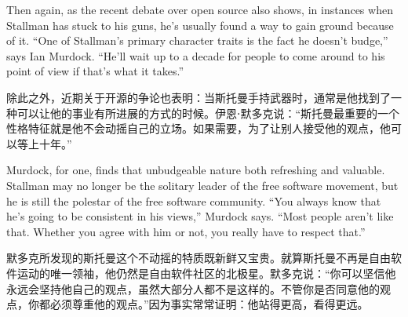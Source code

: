 

\ifdefined\eng
Then again, as the recent debate over open source also shows, in instances when Stallman has stuck to his guns, he's usually found a way to gain ground because of it. ``One of Stallman's primary character traits is the fact he doesn't budge,'' says Ian Murdock. ``He'll wait up to a decade for people to come around to his point of view if that's what it takes.''
\fi

\ifdefined\chs
除此之外，近期关于开源的争论也表明：当斯托曼手持武器时，通常是他找到了一种可以让他的事业有所进展的方式的时候。伊恩⋅默多克说：``斯托曼最重要的一个性格特征就是他不会动摇自己的立场。如果需要，为了让别人接受他的观点，他可以等上十年。''
\fi

\ifdefined\eng
Murdock, for one, finds that unbudgeable nature both refreshing and valuable. Stallman may no longer be the solitary leader of the free software movement, but he is still the polestar of the free software community. ``You always know that he's going to be consistent in his views,'' Murdock says. ``Most people aren't like that. Whether you agree with him or not, you really have to respect that.''
\fi

\ifdefined\chs
默多克所发现的斯托曼这个不动摇的特质既新鲜又宝贵。就算斯托曼不再是自由软件运动的唯一领袖，他仍然是自由软件社区的北极星。默多克说：``你可以坚信他永远会坚持他自己的观点，虽然大部分人都不是这样的。不管你是否同意他的观点，你都必须尊重他的观点。''因为事实常常证明：他站得更高，看得更远。
\fi

\theendnotes
\setcounter{endnote}{0}
